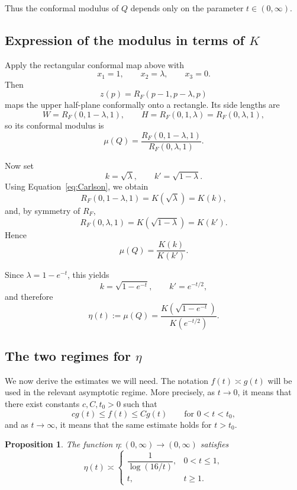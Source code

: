 \documentclass[12pt]{amsart}
\numberwithin{equation}{section}
\numberwithin{figure}{section}
\newtheorem{proposition}[equation]{Proposition}
\theoremstyle{definition}
\theoremstyle{plain}
\begin{document}
Thus the conformal modulus of $Q$ depends only on the parameter $t\in(0,\infty)$.

\subsection{Expression of the modulus in terms of $K$}

Apply the rectangular conformal map above with
\[
x_1=1,\qquad x_2=\lambda,\qquad x_3=0.
\]
Then
\[
z(p)=R_F(p-1,p-\lambda,p)
\]
maps the upper half-plane conformally onto a rectangle. Its side lengths are
\[
W=R_F(0,1-\lambda,1),
\qquad
H=R_F(0,1,\lambda)=R_F(0,\lambda,1),
\]
so its conformal modulus is
\[
\mu(Q)=\frac{R_F(0,1-\lambda,1)}{R_F(0,\lambda,1)}.
\]

Now set
\[
k=\sqrt{\lambda},
\qquad
k'=\sqrt{1-\lambda}.
\]
Using Equation~\ref{eq:Carlson}, we obtain
\[
R_F(0,1-\lambda,1)=K(\sqrt{\lambda})=K(k),
\]
and, by symmetry of $R_F$,
\[
R_F(0,\lambda,1)=K(\sqrt{1-\lambda})=K(k').
\]
Hence
\[
\mu(Q)=\frac{K(k)}{K(k')}.
\]

Since $\lambda=1-e^{-t}$, this yields
\[
k=\sqrt{1-e^{-t}},
\qquad
k'=e^{-t/2},
\]
and therefore
\[
\eta(t):=\mu(Q)=\frac{K(\sqrt{1-e^{-t}})}{K(e^{-t/2})}.
\]

\subsection{The two regimes for $\eta$}

We now derive the estimates we will need.
The notation $f(t)\asymp g(t)$ will be used in the relevant
asymptotic regime. More precisely, as $t\to0$, it means that there
exist constants $c,C,t_0>0$ such that
\[
c g(t)\le f(t)\le C g(t)
\qquad\text{for }0<t<t_0,
\]
and as $t\to\infty$, it means that the same estimate holds for
$t>t_0$.

\begin{proposition}
\label{prop:eta-regimes}
The function $\eta:(0,\infty)\to(0,\infty)$ satisfies
\[
\eta(t)\asymp
\begin{cases}
\dfrac{1}{\log(16/t)}, & 0<t\le 1,\\[1.2ex]
t, & t\ge 1.
\end{cases}
\]
\end{proposition}
\end{document}
